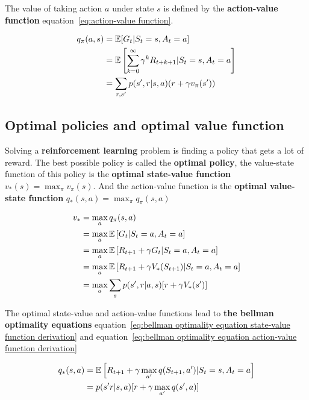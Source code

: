 The value of taking action $a$ under state $s$ is defined by the \textbf{action-value function} equation~\ref{eq:action-value function}.

\begin{equation}
\begin{split}
q_\pi(a, s) 
& = \operatorname{\mathbb{E}}[G_t | S_t = s, A_t = a]\\
& = \operatorname{\mathbb{E}}\left[\sum_{k=0}^\infty \gamma^k R_{t + k + 1} | S_t = s, A_t = a\right]\\
& = \sum_{r,s'} p(s', r|s,a)( r + \gamma v_\pi(s'))
\label{eq:action-value function}
\end{split}
\end{equation}

\subsection{Optimal policies and optimal value function}
Solving a \textbf{reinforcement learning} problem is finding a policy that gets a lot of reward. The best possible policy is called the \textbf{optimal policy}, the value-state function of this policy is the \textbf{optimal state-value function} $v_*(s)=\max_{\pi}v_\pi(s)$. And the action-value function is the \textbf{optimal value-state function} $q_*(s, a)= \max_{\pi} q_\pi (s, a)$ 

\begin{equation}
\begin{split}
v_* 
& = \max_a q_\pi (s, a) \\
& = \max_a \operatorname{\mathbb{E}}\left[ G_t | S_t=a, A_t=a \right] \\
& = \max_a \operatorname{\mathbb{E}}\left[ R_{t+1} + \gamma G_t | S_t=a, A_t=a \right] \\
& = \max_a \operatorname{\mathbb{E}}\left[ R_{t+1} + \gamma V_*(S_{t+1}) | S_t=a, A_t=a \right] \\
& = \max_a \sum_{s}p(s', r | a, s) [r+ \gamma V_*(s')] \\
\end{split}
\label{eq:bellman optimality equation state-value function derivation}
\end{equation}

The optimal state-value and action-value functions lead to \textbf{the bellman optimality equations} equation~\ref{eq:bellman optimality equation state-value function derivation} and equation~\ref{eq:bellman optimality equation action-value function derivation}

\begin{equation}
\begin{split}
q_*(s, a) 
& = \operatorname{\mathbb{E}}\left[ R_{t+1} + \gamma \max_{a'} q(S_{t+1},a') | S_t=s, A_t=a \right] \\
& = p(s' r | s, a)[ r + \gamma \max_{a'} q(s', a)]
\end{split}
\label{eq:bellman optimality equation action-value function derivation}
\end{equation}

